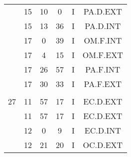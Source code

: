 \documentclass[12pt, a4paper]{article}
\begin{document}
\begin{multicols}{3}
{\begin{tabular}{c c c c c c}
	 	 	 	 & 15 & 10 & 0 & I & PA.D.EXT\\%
	 	 	 	 & 15 & 13 & 36 & I & PA.D.INT\\%
	 	 	 	 & 17 & 0 & 39 & I & OM.F.INT\\%
	 	 	 	 & 17 & 4 & 15 & I & OM.F.EXT\\%
	 	 	 	 & 17 & 26 & 57 & I & PA.F.INT\\%
	 	 	 	 & 17 & 30 & 33 & I & PA.F.EXT\\%
	 	 	 	 & & & & & \\%
	 	 	 	27 & 11 & 57 & 17 & I & EC.D.EXT\\%
	 	 	 	 & 11 & 57 & 17 & I & EC.D.EXT\\%
	 	 	 	 & 12 & 0 & 9 & I & EC.D.INT\\%
	 	 	 	 & 12 & 21 & 20 & I & OC.D.EXT\\%
	 	 \end{tabular}
 	}
\end{multicols}
\end{document}
